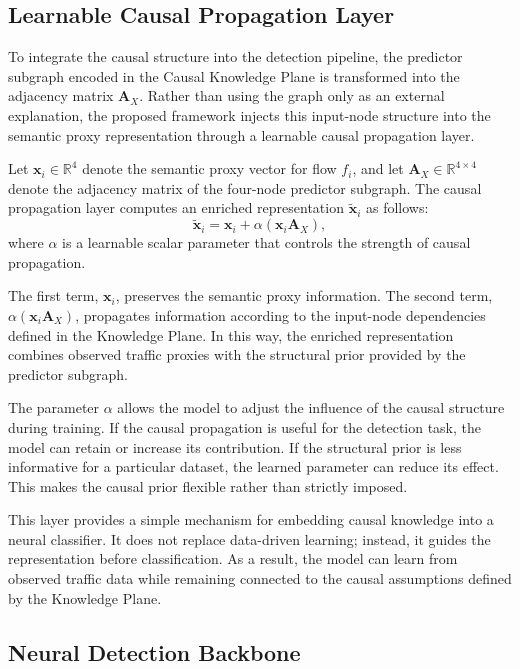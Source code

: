 \documentclass[journal]{IEEEtran}
\begin{document}
\subsection{Learnable Causal Propagation Layer}
\label{subsec:causal_propagation_layer}

To integrate the causal structure into the detection pipeline, the predictor
subgraph encoded in the Causal Knowledge Plane is transformed into the
adjacency matrix $\mathbf{A}_{X}$. Rather than using the graph only as an
external explanation, the proposed framework injects this input-node
structure into the semantic proxy representation through a learnable causal
propagation layer.

Let $\mathbf{x}_i \in \mathbb{R}^{4}$ denote the semantic proxy vector for
flow $f_i$, and let $\mathbf{A}_{X} \in \mathbb{R}^{4 \times 4}$ denote the
adjacency matrix of the four-node predictor subgraph. The causal propagation
layer computes an enriched representation $\tilde{\mathbf{x}}_i$ as follows:
\[
  \tilde{\mathbf{x}}_i
  = \mathbf{x}_i + \alpha(\mathbf{x}_i \mathbf{A}_{X}),
\]
where $\alpha$ is a learnable scalar parameter that controls the strength of causal propagation.

The first term, $\mathbf{x}_i$, preserves the semantic proxy information. The
second term, $\alpha(\mathbf{x}_i \mathbf{A}_{X})$, propagates information
according to the input-node dependencies defined in the Knowledge Plane. In
this way, the enriched representation combines observed traffic proxies with
the structural prior provided by the predictor subgraph.

The parameter $\alpha$ allows the model to adjust the influence of the causal structure during training. If the causal propagation is useful for the detection task, the model can retain or increase its contribution. If the structural prior is less informative for a particular dataset, the learned parameter can reduce its effect. This makes the causal prior flexible rather than strictly imposed.

This layer provides a simple mechanism for embedding causal knowledge into a neural classifier. It does not replace data-driven learning; instead, it guides the representation before classification. As a result, the model can learn from observed traffic data while remaining connected to the causal assumptions defined by the Knowledge Plane.

\subsection{Neural Detection Backbone}
\label{subsec:neural_detection_backbone}
\end{document}
